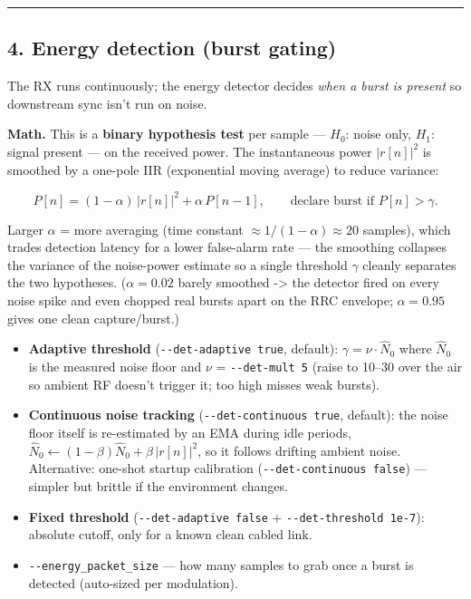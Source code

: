 \documentclass[
  10pt,
]{article}
\providecommand{\tightlist}{%
  \setlength{\itemsep}{0pt}\setlength{\parskip}{0pt}}
\begin{document}
\begin{center}\rule{0.5\linewidth}{0.5pt}\end{center}

\hypertarget{4-energy-detection-burst-gating}{%
\subsection{4. Energy detection (burst
gating)}\label{4-energy-detection-burst-gating}}

The RX runs continuously; the energy detector decides \emph{when a burst
is present} so downstream sync isn't run on noise.

\textbf{Math.} This is a \textbf{binary hypothesis test} per sample ---
\(H_0\): noise only, \(H_1\): signal present --- on the received power.
The instantaneous power \(|r[n]|^2\) is smoothed by a one-pole IIR
(exponential moving average) to reduce variance:

\[ P[n] = (1-\alpha)\,|r[n]|^2 + \alpha\,P[n-1], \qquad \text{declare burst if } P[n] > \gamma. \]

Larger \(\alpha\) = more averaging (time constant
\(\approx 1/(1-\alpha)\approx 20\) samples), which trades detection
latency for a lower false-alarm rate --- the smoothing collapses the
variance of the noise-power estimate so a single threshold \(\gamma\)
cleanly separates the two hypotheses. (\(\alpha=0.02\) barely smoothed
-\textgreater{} the detector fired on every noise spike and even chopped
real bursts apart on the RRC envelope; \(\alpha=0.95\) gives one clean
capture/burst.)

\begin{itemize}
\tightlist
\item
  \textbf{Adaptive threshold} (\texttt{-\/-det-adaptive\ true},
  default): \(\gamma = \nu \cdot \hat{N}_0\) where \(\hat{N}_0\) is the
  measured noise floor and \(\nu\) = \texttt{-\/-det-mult\ 5} (raise to
  10--30 over the air so ambient RF doesn't trigger it; too high misses
  weak bursts).
\item
  \textbf{Continuous noise tracking} (\texttt{-\/-det-continuous\ true},
  default): the noise floor itself is re-estimated by an EMA during idle
  periods,
  \(\hat{N}_0 \leftarrow (1-\beta)\hat{N}_0 + \beta\,|r[n]|^2\), so it
  follows drifting ambient noise. Alternative: one-shot startup
  calibration (\texttt{-\/-det-continuous\ false}) --- simpler but
  brittle if the environment changes.
\item
  \textbf{Fixed threshold} (\texttt{-\/-det-adaptive\ false} +
  \texttt{-\/-det-threshold\ 1e-7}): absolute cutoff, only for a known
  clean cabled link.
\item
  \texttt{-\/-energy\_packet\_size} --- how many samples to grab once a
  burst is detected (auto-sized per modulation).
\end{itemize}
\end{document}
